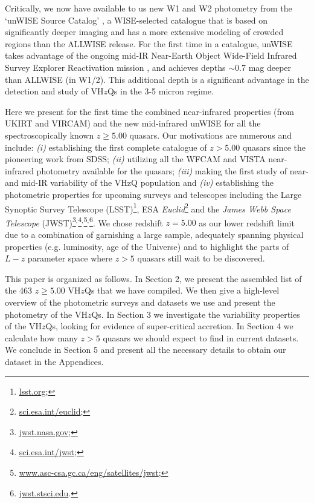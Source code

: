 \documentclass[usenatbib]{mnras}
\begin{document}
Critically, we now have available to us new W1 and W2 photometry from the `unWISE Source Catalog' \citep[][]{Schlafly2019}, a WISE-selected catalogue that is based on significantly deeper imaging and has a more extensive modeling of crowded regions than the ALLWISE release. For the first time in a catalogue, unWISE takes advantage of the ongoing mid-IR Near-Earth Object Wide-Field Infrared Survey Explorer Reactivation mission \citep[NEOWISE-R; ][]{Mainzer2014}, and achieves depths $\sim$0.7 mag deeper than ALLWISE (in W1/2).  This additional depth is a significant advantage in the detection and study of VH$z$Qs in the 3-5 micron regime.

Here we present for the first time the combined near-infrared properties (from UKIRT and VIRCAM) and the new mid-infrared unWISE for
all the spectroscopically known $z\geq5.00$ quasars. Our motivations are numerous and include: {\it (i)} establishing the first complete
catalogue of $z>5.00$ quasars since the pioneering work from SDSS; {\it (ii)} utilizing all the WFCAM and VISTA near-infrared photometry
available for the quasars; {\it (iii)} making the first study of near- and mid-IR variability of the VHzQ population and {\it (iv)} establishing the photometric properties for upcoming surveys and telescopes including the Large Synoptic Survey Telescope (LSST)\footnote{\href{https://www.lsst.org}{lsst.org};}, ESA {\it Euclid}\footnote{\href{https://sci.esa.int/euclid/}{sci.esa.int/euclid};} and the {\it James Webb Space Telescope} (JWST)\footnote{\href{https://www.jwst.nasa.gov/}{jwst.nasa.gov};}$^,$\footnote{\href{https://sci.esa.int/jwst/}{sci.esa.int/jwst};}$^,$\footnote{\href{https://www.asc-csa.gc.ca/eng/satellites/jwst/}{www.asc-csa.gc.ca/eng/satellites/jwst};}$^,$\footnote{\href{https://jwst.stsci.edu/}{jwst.stsci.edu}.}. We chose redshift $z=5.00$ as our lower redshift limit due to a combination of garnishing a large sample, adequately spanning physical properties (e.g. luminosity, age of the Universe) and to highlight the parts of $L-z$ parameter space where $z>5$ quasars still wait to be discovered.

This paper is organized as follows. In Section 2, we present the
assembled list of the 463 $z\geq5.00$ VH$z$Qs that we have
compiled. We then give a high-level overview of the photometric
surveys and datasets we use and present the photometry of the
VH$z$Qs. In Section 3 we investigate the variability properties of the
VH$z$Qs, looking for evidence of super-critical accretion. In Section
4 we calculate how many $z>5$ quasars we should expect to find in
current datasets. We conclude in Section 5 and present all the
necessary details to obtain our dataset in the Appendices.
\end{document}
